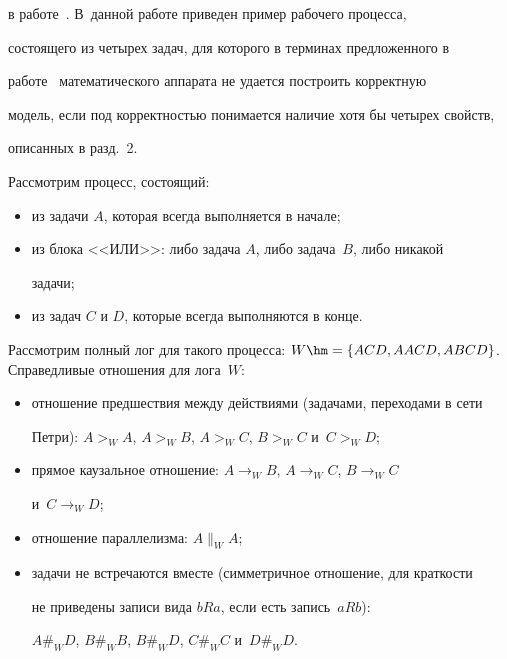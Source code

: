 в работе~\cite{5-tg}. В~данной работе приведен пример рабочего процесса, 

состоящего из четырех задач, для которого в терминах предложенного в 

работе~\cite{5-tg} математического аппарата не удается построить корректную 

модель, если под корректностью понимается наличие хотя бы четырех свойств, 

описанных в разд.~2.

  

  Рассмотрим процесс, состоящий:

  \begin{itemize}

  \item из задачи $A$, которая всегда выполняется в начале;

\item из блока <<ИЛИ>>: либо задача $A$, либо задача~$B$, либо никакой 

задачи;

\item из задач $C$ и $D$, которые всегда выполняются в конце.

\end{itemize}



  Рассмотрим полный лог для такого процесса: $W\hm= \{ ACD, AACD, ABCD 

\}$. Справедливые отношения для лога~$W$: 

  \begin{itemize}

  \item отношение предшествия между действиями (задачами, переходами в сети 

Петри): $A>_W A$, $A>_W B$, $A>_W C$, $B >_W C$ и~$C >_W D$;

  \item прямое каузальное отношение: $A\to_W B$, $A \to_W C$, $B\to_W C$ 

и~$C\to_W D$;

  \item отношение параллелизма: $A \|_W A$;

  \item задачи не встречаются вместе (симметричное отношение, для краткости 

не приведены записи вида $bRa$, если есть запись~$aRb$):

  $A \#_W D$, $ B \#_W B$, $B\#_W D$, $C\#_W C$ и~$D \#_W D$.

  \end{itemize}

